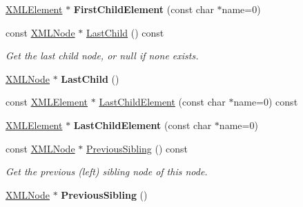 \begin{DoxyCompactItemize}
\mbox{\hyperlink{classtinyxml2_1_1XMLElement}{X\+M\+L\+Element}} $\ast$ {\bfseries First\+Child\+Element} (const char $\ast$name=0)
\item 
\mbox{\label{classtinyxml2_1_1XMLNode_a9b8583a277e8e26f4cbbb5492786778e}} 
const \mbox{\hyperlink{classtinyxml2_1_1XMLNode}{X\+M\+L\+Node}} $\ast$ \mbox{\hyperlink{classtinyxml2_1_1XMLNode_a9b8583a277e8e26f4cbbb5492786778e}{Last\+Child}} () const
\begin{DoxyCompactList}\small\item\em Get the last child node, or null if none exists. \end{DoxyCompactList}\item 
\mbox{\label{classtinyxml2_1_1XMLNode_ad7552c8cb1dc0cb6f3bdc14a9d115dbf}} 
\mbox{\hyperlink{classtinyxml2_1_1XMLNode}{X\+M\+L\+Node}} $\ast$ {\bfseries Last\+Child} ()
\item 
const \mbox{\hyperlink{classtinyxml2_1_1XMLElement}{X\+M\+L\+Element}} $\ast$ \mbox{\hyperlink{classtinyxml2_1_1XMLNode_a173e9d1341bc56992e2d320a35936551}{Last\+Child\+Element}} (const char $\ast$name=0) const
\item 
\mbox{\label{classtinyxml2_1_1XMLNode_a1b77a8194d059665a4412ebfea276878}} 
\mbox{\hyperlink{classtinyxml2_1_1XMLElement}{X\+M\+L\+Element}} $\ast$ {\bfseries Last\+Child\+Element} (const char $\ast$name=0)
\item 
\mbox{\label{classtinyxml2_1_1XMLNode_aac667c513d445f8b783e1e15ef9d3551}} 
const \mbox{\hyperlink{classtinyxml2_1_1XMLNode}{X\+M\+L\+Node}} $\ast$ \mbox{\hyperlink{classtinyxml2_1_1XMLNode_aac667c513d445f8b783e1e15ef9d3551}{Previous\+Sibling}} () const
\begin{DoxyCompactList}\small\item\em Get the previous (left) sibling node of this node. \end{DoxyCompactList}\item 
\mbox{\label{classtinyxml2_1_1XMLNode_ae760e5e7e766df1d2cf3bb4a847876d6}} 
\mbox{\hyperlink{classtinyxml2_1_1XMLNode}{X\+M\+L\+Node}} $\ast$ {\bfseries Previous\+Sibling} ()
\item 
\mbox{\label{classtinyxml2_1_1XMLNode_a872936cae46fb473eb47fec99129fc70}} 

\end{DoxyCompactItemize}
